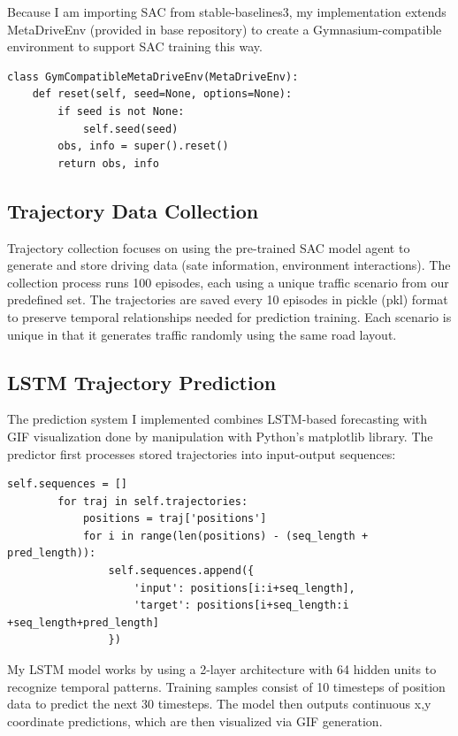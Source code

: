 \documentclass[10pt]{IEEEtran}
\begin{document}
Because I am importing SAC from stable-baselines3, my implementation extends MetaDriveEnv (provided in base repository) to create a Gymnasium-compatible environment to support SAC training this way.
\begin{lstlisting}
class GymCompatibleMetaDriveEnv(MetaDriveEnv):
    def reset(self, seed=None, options=None):
        if seed is not None:
            self.seed(seed)
        obs, info = super().reset()
        return obs, info
\end{lstlisting}

\subsection{Trajectory Data Collection}
Trajectory collection focuses on using the pre-trained SAC model agent to generate and store driving data (sate information, environment interactions). The collection process runs 100 episodes, each using a unique traffic scenario from our predefined set. The trajectories are saved every 10 episodes in pickle (pkl) format to preserve temporal relationships needed for prediction training. Each scenario is unique in that it generates traffic randomly using the same road layout.

\subsection{LSTM Trajectory Prediction}
The prediction system I implemented combines LSTM-based forecasting with GIF visualization done by manipulation with Python's matplotlib library. The predictor first processes stored trajectories into input-output sequences:

\begin{lstlisting}
self.sequences = []
        for traj in self.trajectories:
            positions = traj['positions']
            for i in range(len(positions) - (seq_length + pred_length)):
                self.sequences.append({
                    'input': positions[i:i+seq_length],
                    'target': positions[i+seq_length:i +seq_length+pred_length]
                })
\end{lstlisting}

My LSTM model works by using a 2-layer architecture with 64 hidden units to recognize temporal patterns. Training samples consist of 10 timesteps of position data to predict the next 30 timesteps. The model then outputs continuous x,y coordinate predictions, which are then visualized via GIF generation.
\end{document}
